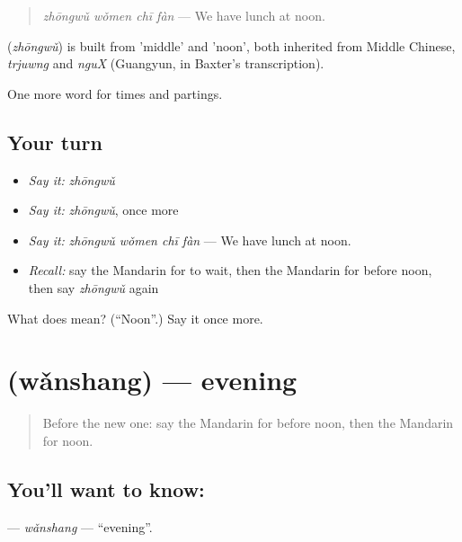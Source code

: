 \begin{quote}
\textbf{} \emph{zhōngwǔ wǒmen chī fàn} — We have lunch at noon.
\end{quote}

\begin{cousinweb}
\textbf{} (\emph{zhōngwǔ}) is built from  'middle' and  'noon', both inherited from Middle Chinese, \emph{trjuwng} and \emph{nguX} (Guangyun, in Baxter's transcription).
\end{cousinweb}

\begin{grammarlens}[title={What you've built}]
One more word for times and partings.
\end{grammarlens}

\subsection*{Your turn}
\begin{itemize}
\raggedright
  \item \emph{Say it:} \emph{zhōngwǔ}
  \item \emph{Say it:} \emph{zhōngwǔ}, once more
  \item \emph{Say it:} \emph{zhōngwǔ wǒmen chī fàn} — We have lunch at noon.
  \item \emph{Recall:} say the Mandarin for to wait, then the Mandarin for before noon, then say \emph{zhōngwǔ} again
\end{itemize}

\begin{tcolorbox}[breakable,colback=teal!4,colframe=teal!35!black,title={Before you move on}]
What does  mean? (\textquotedblleft{}Noon\textquotedblright{}.) Say it once more.
\end{tcolorbox}
\section[\texorpdfstring{\zh{晚上} (wǎnshang)}{晚上 (wǎnshang)}]{ (wǎnshang) — evening}

\label{lesson:ZH-C49-wanshang}



\begin{quote}
Before the new one: say the Mandarin for before noon, then the Mandarin for noon.
\end{quote}

\subsection*{You'll want to know: }
\textbf{} — \emph{wǎnshang} — \textquotedblleft{}evening\textquotedblright{}.

